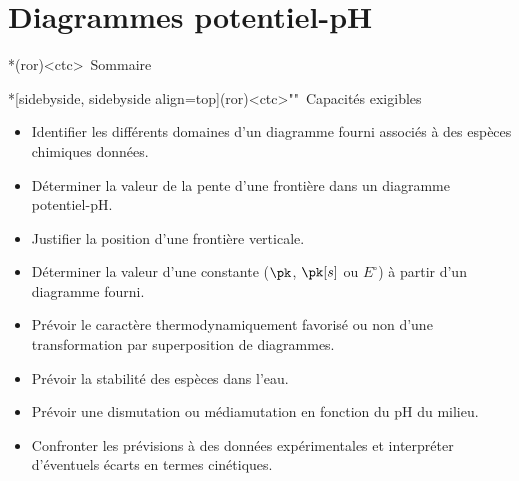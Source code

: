 \documentclass[a4paper, 10pt, landscape, twocolumn]{book}
\begin{document}
\setcounter{chapter}{6}


\chapter{Diagrammes potentiel-pH}


\begin{tcb}*(ror)<ctc>{\iconsomm~Sommaire}
	\vspace{-15pt}
	\minitoc
	\vspace{-25pt}
\end{tcb}

\begin{tcb}*[sidebyside, sidebyside align=top](ror)<ctc>""{\iconhow~Capacités exigibles}
	\small
	\begin{itemize}[label=\rcheck]
		\item Identifier les différents domaines d'un diagramme fourni associés à
		      des espèces chimiques données.
		\item Déterminer la valeur de la pente d'une frontière dans un diagramme
		      potentiel-pH.
		\item Justifier la position d'une frontière verticale.
		\item Déterminer la valeur d'une constante ($\pk$, $\pk[s]$ ou $E^\circ$)
		      à partir d'un diagramme fourni.
	\end{itemize}
	\tcblower
	\begin{itemize}[label=\rcheck]
		\item Prévoir le caractère thermodynamiquement favorisé ou non d'une
		      transformation par superposition de diagrammes.
		\item Prévoir la stabilité des espèces dans l'eau.
		\item Prévoir une dismutation ou médiamutation en fonction du pH du milieu.
		\item Confronter les prévisions à des données expérimentales et
		      interpréter d'éventuels écarts en termes cinétiques.
	\end{itemize}
\end{tcb}
\vspace{-15pt}
\end{document}
